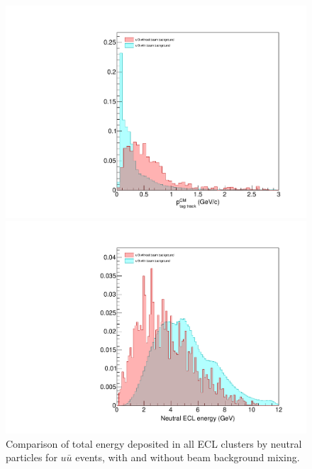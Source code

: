 \documentclass[12pt]{thesis}  %
\begin{document}
    
\begin{figure}
\centering
\begin{minipage}{.475\textwidth}
  \centering
  \includegraphics[width=\linewidth]{images/uubar-tagtrackP-beambackground.pdf}
  \caption[]%
  {{\small Comparison of tag-track momentum for $u\bar{u}$ events, with and without beam background mixing.}}    
  \label{fig:uubar tagtrackP beambackground}
\end{minipage}%
        \hfill
\begin{minipage}{.475\textwidth}
  \centering
  \includegraphics[width=\linewidth]{images/uubar-neutralEclEnergy-beambackground.pdf}
  \caption[]%
  {{\small Comparison of total energy deposited in all ECL clusters by neutral particles for $u\bar{u}$ events, with and without beam background mixing.}}  
  \label{fig:uubar neutralEclEnergy beambackground}
\end{minipage}
\end{figure}
    
\end{document}
